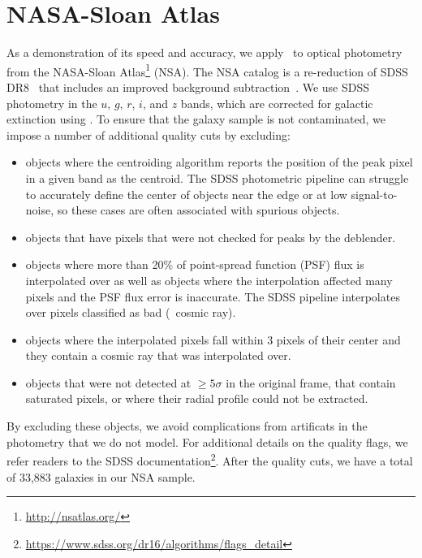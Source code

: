 \section{NASA-Sloan Atlas} \label{sec:obs}
As a demonstration of its speed and accuracy, we apply \sedflow~to optical
photometry from the NASA-Sloan Atlas\footnote{\url{http://nsatlas.org/}} (NSA).
The NSA catalog is a re-reduction of SDSS DR8~\citep{aihara2011} that includes
an improved background subtraction~\citep{blanton2011}.
We use SDSS photometry in the $u$, $g$, $r$, $i$, and $z$ bands, which are
corrected for galactic extinction using \cite{schlegel1998}.
To ensure that the galaxy sample is not contaminated, we impose a number of
additional quality cuts by excluding:
\begin{itemize}
    \item objects where the centroiding algorithm reports the
    position of the peak pixel in a given band as the centroid. 
    The SDSS photometric pipeline can struggle to accurately define the center
    of objects near the edge or at low signal-to-noise, so these cases are
    often associated with spurious objects. 
    \item objects that have pixels that were not checked for peaks by the
    deblender. 
    \item objects where more than 20\% of point-spread function (PSF) flux is
    interpolated over as well as objects where the interpolation affected many
    pixels and the PSF flux error is inaccurate. 
    The SDSS pipeline interpolates over pixels classified as bad (\eg~cosmic
    ray).
    \item objects where the interpolated pixels fall within 3 pixels of their
    center and they contain a cosmic ray that was interpolated over.
    \item objects that were not detected at $\ge5\sigma$ in the original frame,
    that contain saturated pixels, or where their radial profile could not be
    extracted.
\end{itemize}
By excluding these objects, we avoid complications from artificats in the
photometry that we do not model. 
For additional details on the quality flags, we refer readers to the SDSS
documentation\footnote{\url{https://www.sdss.org/dr16/algorithms/flags_detail}}.
After the quality cuts, we have a total of 33,883 galaxies in our NSA sample.

